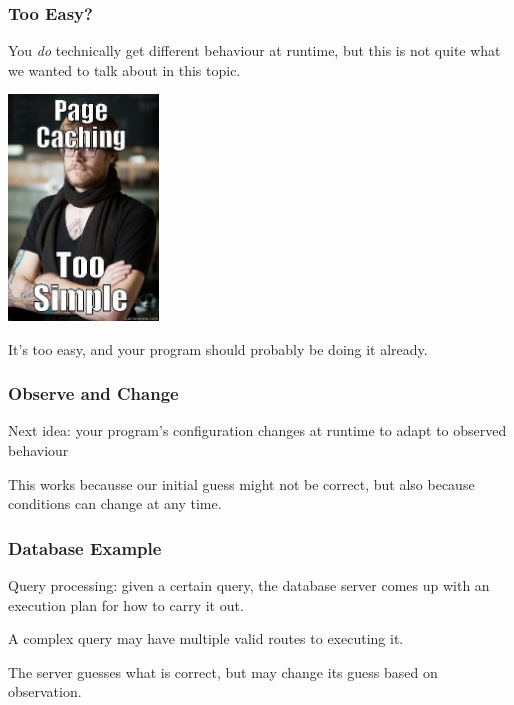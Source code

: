 \begin{frame}
\frametitle{Too Easy?}

You \textit{do} technically get different behaviour at runtime, but this is not quite what we wanted to talk about in this topic. 

\begin{center}
	\includegraphics[width=0.3\textwidth]{images/caching.jpg}
\end{center}

It's too easy, and your program should probably be doing it already.

\end{frame}


\begin{frame}
\frametitle{Observe and Change}
Next idea:  your program's configuration changes at runtime to adapt to observed behaviour

This works becausse our initial guess might not be correct, but also because conditions can change at any time.

\end{frame}


\begin{frame}
\frametitle{Database Example}
Query processing: given a certain query, the database server comes up with an execution plan for how to carry it out.

A complex query may have multiple valid routes to executing it.

The server guesses what is correct, but may change its guess based on observation.

\end{frame}

